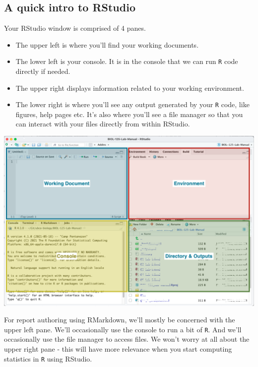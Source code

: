 \documentclass[
]{book}
\providecommand{\tightlist}{%
  \setlength{\itemsep}{0pt}\setlength{\parskip}{0pt}}
\begin{document}
\hypertarget{a-quick-intro-to-rstudio}{%
\subsection*{A quick intro to RStudio}\label{a-quick-intro-to-rstudio}}

Your RStudio window is comprised of 4 panes.

\begin{itemize}
\tightlist
\item
  The upper left is where you'll find your working documents.
\item
  The lower left is your console. It is in the console that we can run \texttt{R} code directly if needed.
\item
  The upper right displays information related to your working environment.
\item
  The lower right is where you'll see any output generated by your \texttt{R} code, like figures, help pages etc. It's also where you'll see a file manager so that you can interact with your files directly from within RStudio.
\end{itemize}

\includegraphics{images/Intro-RStudio_20220101.png}

For report authoring using RMarkdown, we'll mostly be concerned with the upper left pane. We'll occasionally use the console to run a bit of \texttt{R}. And we'll occasionally use the file manager to access files. We won't worry at all about the upper right pane - this will have more relevance when you start computing statistics in \texttt{R} using RStudio.
\end{document}
